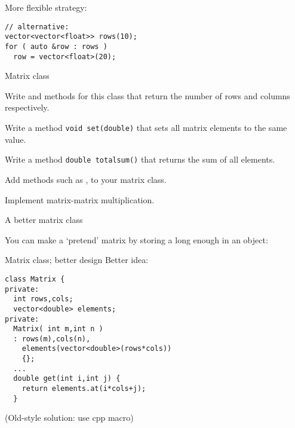 \begin{remark}
More flexible strategy:
\begin{lstlisting}
// alternative:
vector<vector<float>> rows(10);
for ( auto &row : rows )
  row = vector<float>(20);
\end{lstlisting}
\end{remark}

\begin{block}{Matrix class}
  \label{sl:matrix-class}
  \lstset{style=snippetcode}
\end{block}

\begin{exercise}
  \label{ex:matrixclass-rowcol1}
  Write  and  methods for this class that return
  the number of rows and columns respectively.
\end{exercise}

\begin{exercise}
  \label{ex:matrix-set-sum}
  Write a method \lstinline+void set(double)+ that sets all
  matrix elements to the same value.

  Write a method \lstinline+double totalsum()+ that returns
  the sum of all elements.
\end{exercise}

\begin{exercise}
  \label{ex:matrix-methods}
  Add methods such as ,  to your matrix class.

  Implement matrix-matrix multiplication.
\end{exercise}

 {A better matrix class}

You can make a `pretend' matrix by storing a long enough  in
an object:
%

\begin{slide}{Matrix class; better design}
  \label{sl:matrix-class-cont}
  Better idea:
  \lstset{style=snippetcode}
\begin{lstlisting}
class Matrix {
private:
  int rows,cols;
  vector<double> elements;
private:
  Matrix( int m,int n )
  : rows(m),cols(n),
    elements(vector<double>(rows*cols))
    {};
  ...
  double get(int i,int j) {
    return elements.at(i*cols+j);
  }
\end{lstlisting}
(Old-style solution: use cpp macro)
\end{slide}


